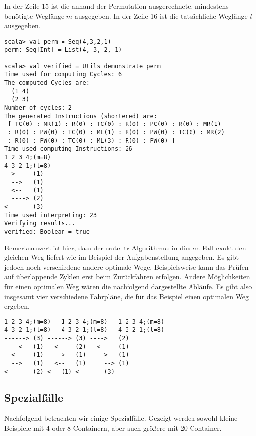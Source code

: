 In der Zeile 15 ist die anhand der Permutation ausgerechnete, mindestens benötigte Weglänge $m$ ausgegeben.
In der Zeile 16 ist die tatsächliche Weglänge $l$ ausgegeben.
\begin{lstlisting}
scala> val perm = Seq(4,3,2,1)
perm: Seq[Int] = List(4, 3, 2, 1)

scala> val verified = Utils demonstrate perm 
Time used for computing Cycles: 6
The computed Cycles are: 
  (1 4)
  (2 3)
Number of cycles: 2
The generated Instructions (shortened) are: 
 [ TC(0) : MR(1) : R(0) : TC(0) : R(0) : PC(0) : R(0) : MR(1)
 : R(0) : PW(0) : TC(0) : ML(1) : R(0) : PW(0) : TC(0) : MR(2)
 : R(0) : PW(0) : TC(0) : ML(3) : R(0) : PW(0) ] 
Time used computing Instructions: 26
1 2 3 4;(m=8)
4 3 2 1;(l=8)
-->     (1)
  -->   (1)
  <--   (1)
  ----> (2)
<------ (3)
Time used interpreting: 23
Verifying results...
verified: Boolean = true
\end{lstlisting}
 Bemerkenswert ist hier, dass der erstellte Algorithmus in diesem Fall exakt den gleichen Weg liefert wie im Beispiel der Aufgabenstellung angegeben.
 Es gibt jedoch noch verschiedene andere optimale Wege.
 Beispielsweise kann das Prüfen auf überlappende Zyklen erst beim Zurückfahren erfolgen.
 Andere Möglichkeiten für einen optimalen Weg wären die nachfolgend dargestellte Abläufe.
 Es gibt also insgesamt vier verschiedene Fahrpläne, die für das Beispiel einen optimalen Weg ergeben.
\begin{lstlisting}                   
1 2 3 4;(m=8)	1 2 3 4;(m=8)	1 2 3 4;(m=8)
4 3 2 1;(l=8)	4 3 2 1;(l=8)	4 3 2 1;(l=8)
------>	(3)	------>	(3)	---->	(2)
    <--	(1)	  <----	(2)	  <--	(1)
  <--	(1)	  -->	(1)	  -->	(1)
  -->	(1)	  <--	(1)	    -->	(1)
<----	(2)	<--	(1)	<------	(3)
\end{lstlisting}
\clearpage
\subsection{Spezialfälle}
\label{special_cases}
Nachfolgend betrachten wir einige Spezialfälle. Gezeigt werden sowohl kleine Beispiele mit 4 oder 8 Containern, aber auch größere mit 20 Container.
